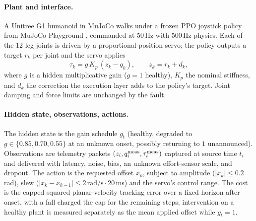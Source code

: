 \documentclass[10pt,twocolumn]{article}
\begin{document}
\paragraph{Plant and interface.}
A Unitree G1 humanoid in MuJoCo \citep{todorov2012mujoco} walks under a frozen PPO
\citep{schulman2017ppo} joystick policy from MuJoCo Playground \citep{zakka2025playground},
commanded at 50\,Hz with 500\,Hz physics. Each of the 12 leg joints is driven by a
proportional position servo; the policy outputs a target $r_k$ per joint and the servo applies
\begin{equation}
\tau_k = g\,K_p\,(z_k - q_k),
\qquad z_k = r_k + d_k ,
\label{eq:servo}
\end{equation}
where $g$ is a hidden multiplicative gain ($g=1$ healthy), $K_p$ the nominal stiffness, and
$d_k$ the correction the execution layer adds to the policy's target. Joint damping and force
limits are unchanged by the fault.

\paragraph{Hidden state, observations, actions.}
The hidden state is the gain schedule $g_t$ (healthy, degraded to $g\in\{0.85,0.70,0.55\}$ at
an unknown onset, possibly returning to $1$ unannounced). Observations are telemetry packets
$(z_i, q_i^{\rm meas}, \tau_i^{\rm meas})$ captured at source time $t_i$ and delivered with
latency, noise, bias, an unknown effort-sensor scale, and dropout. The action is the
requested offset $x_k$, subject to amplitude ($|x_k|\le 0.2$\,rad), slew ($|x_k - x_{k-1}|\le
2\,\text{rad/s}\cdot 20$\,ms) and the servo's control range. The cost is the capped squared
planar-velocity tracking error over a fixed horizon after onset, with a fall charged the cap
for the remaining steps; intervention on a healthy plant is measured separately as the mean
applied offset while $g_t=1$.
\end{document}
